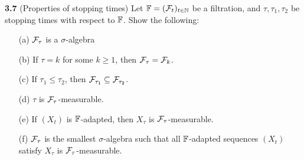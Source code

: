 \noindent\textbf{3.7} (Properties of stopping times) Let $\mathbb{F} = (\mathcal{F}_t)_{t \in \mathbb{N}}$ be a filtration, and $\tau,\tau_1,\tau_2$ be stopping times with respect to $\mathbb{F}$. Show the following:


\begin{enumerate}
   \item[(a)] $\mathcal{F}_\tau$ is a $\sigma$-algebra
   \item[(b)] If $\tau =k$ for some $k\ge 1$, then $\mathcal{F}_\tau = \mathcal{F}_k$.
   \item[(c)] If $\tau_1 \le \tau_2$, then $\mathcal{F}_{\tau_1} \subseteq \mathcal{F}_{\tau_2}$.
   \item[(d)] $\tau$ is $\mathcal{F}_\tau$-measurable.
   \item[(e)] If $(X_t)$ is $\mathbb{F}$-adapted, then $X_\tau$ is $\mathcal{F}_\tau$-measurable.
   \item[(f)] $\mathcal{F}_\tau$ is the smallest $\sigma$-algebra such that all $\mathbb{F}$-adapted sequences $(X_t)$ satisfy $X_\tau$ is $\mathcal{F}_\tau$-measurable.
\end{enumerate}